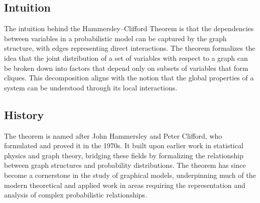 \documentclass{article}
\begin{document}
\subsection{Intuition}
The intuition behind the Hammersley–Clifford Theorem is that the dependencies between variables in a probabilistic model can be captured by the graph structure, with edges representing direct interactions. The theorem formalizes the idea that the joint distribution of a set of variables with respect to a graph can be broken down into factors that depend only on subsets of variables that form cliques. This decomposition aligns with the notion that the global properties of a system can be understood through its local interactions.

\subsection{History}
The theorem is named after John Hammersley and Peter Clifford, who formulated and proved it in the 1970s. It built upon earlier work in statistical physics and graph theory, bridging these fields by formalizing the relationship between graph structures and probability distributions. The theorem has since become a cornerstone in the study of graphical models, underpinning much of the modern theoretical and applied work in areas requiring the representation and analysis of complex probabilistic relationships.
\end{document}
